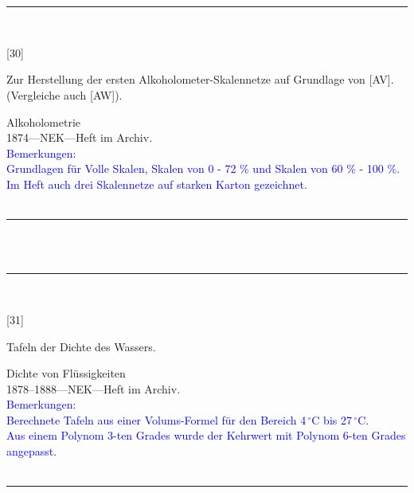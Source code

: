 \\
\vspace*{-2.5pt}\\
\parbox{\textwidth}{%
\rule{\textwidth}{1pt}\vspace*{-3mm}\\
\begin{minipage}[t]{0.15\textwidth}\vspace{0pt}
\Huge\rule[-4mm]{0cm}{1cm}[30]
\end{minipage}
\hfill
\begin{minipage}[t]{0.85\textwidth}\vspace{0pt}
\large Zur Herstellung der ersten Alkoholometer-Skalennetze auf Grundlage von [AV]. (Vergleiche auch [AW]).\rule[-2mm]{0mm}{2mm}
\end{minipage}
{\footnotesize\flushright
Alkoholometrie\\
}
1874\quad---\quad NEK\quad---\quad Heft im Archiv.\\
\textcolor{blue}{Bemerkungen:\\{}
Grundlagen für Volle Skalen, Skalen von 0 - 72 \%{} und Skalen von 60 \%{} - 100 \%{}.\\{}
Im Heft auch drei Skalennetze auf starken Karton gezeichnet.\\{}
}
\\[-15pt]
\rule{\textwidth}{1pt}
}
\\
\vspace*{-2.5pt}\\
\parbox{\textwidth}{%
\rule{\textwidth}{1pt}\vspace*{-3mm}\\
\begin{minipage}[t]{0.15\textwidth}\vspace{0pt}
\Huge\rule[-4mm]{0cm}{1cm}[31]
\end{minipage}
\hfill
\begin{minipage}[t]{0.85\textwidth}\vspace{0pt}
\large Tafeln der Dichte des Wassers.\rule[-2mm]{0mm}{2mm}
\end{minipage}
{\footnotesize\flushright
Dichte von Flüssigkeiten\\
}
1878--1888\quad---\quad NEK\quad---\quad Heft im Archiv.\\
\textcolor{blue}{Bemerkungen:\\{}
Berechnete Tafeln aus einer Volums-Formel für den Bereich 4\,{$^\circ$}C bis 27\,{$^\circ$}C.\\{}
Aus einem Polynom 3-ten Grades wurde der Kehrwert mit Polynom 6-ten Grades angepasst.\\{}
}
\\[-15pt]
\rule{\textwidth}{1pt}
}
